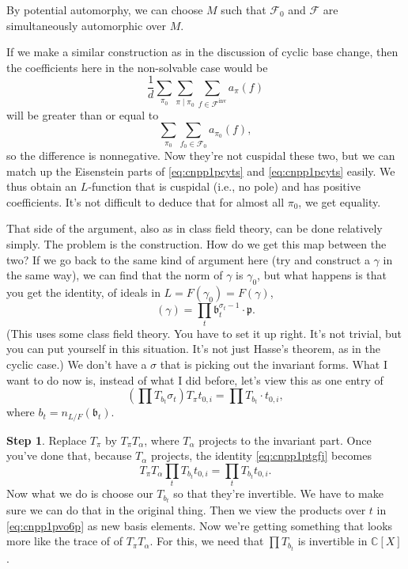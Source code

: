\documentclass[reqno]{amsart} 
\begin{document}
By potential automorphy, we can choose $M$ such that $\mathcal{F}_0$ and $\mathcal{F}$ are simultaneously automorphic over $M$.

If we make a similar construction as in the discussion of cyclic base change, then the coefficients here in the non-solvable case would be
\begin{equation*}
  \frac{1}{d} \sum_{\pi_0} \sum_{\pi \mid \pi_0} \sum_{f \in \mathcal{F}^{\mathrm{inv}}}
  a_{\pi}(f)  
\end{equation*}
will be greater than or equal to
\begin{equation*}
  \sum_{\pi_0}  \sum_{f_0 \in \mathcal{F}_0 }
  a_{\pi_0}(f),
\end{equation*}
so the difference is nonnegative.  Now they're not cuspidal these two, but we can match up the Eisenstein parts of \eqref{eq:cnpp1pcyts} and \eqref{eq:cnpp1pcyts} easily.  We thus obtain an $L$-function that is cuspidal (i.e., no pole) and has positive coefficients.  It's not difficult to deduce that for almost all $\pi_0$, we get equality.

That side of the argument, also as in class field theory, can be done relatively simply.  The problem is the construction.  How do we get this map between the two?  If we go back to the same kind of argument here (try and construct a $\gamma$ in the same way), we can find that the norm of $\gamma$ is $\gamma_0$, but what happens is that you get the identity, of ideals in $L = F(\gamma_0) = F(\gamma)$,
\begin{equation*}
  (\gamma) = \prod_t \mathfrak{b}_t^{\sigma_t - 1} \cdot \mathfrak{p}.
\end{equation*}
(This uses some class field theory.  You have to set it up right.  It's not trivial, but you can put yourself in this situation.  It's not just Hasse's theorem, as in the cyclic case.)  We don't have a $\sigma$ that is picking out the invariant forms.  What I want to do now is, instead of what I did before, let's view this as one entry of 
\begin{equation}\label{eq:cnpp1ptgfj}
  (\prod T_{b_t} \sigma_t) T_\pi t_{0, i}
  = \prod T_{b_t} \cdot t_{0, i},
\end{equation}
where $b_t = n_{L / F}(\mathfrak{b}_t)$.

\textbf{Step 1}. Replace $T_\pi$ by $T_\pi T_\alpha$, where $T_\alpha$ projects to the invariant part.  Once you've done that, because $T_\alpha$ projects, the identity \eqref{eq:cnpp1ptgfj} becomes
\begin{equation}\label{eq:cnpp1pvo6p}
  T_\pi T_\alpha 
  \prod_t T_{b_t}   t_{0, i}
  = \prod_t T_{b_t}  t_{0, i}.
\end{equation}
Now what we do is choose our $T_{b_t}$ so that they're invertible.  We have to make sure we can do that in the original thing.  Then we view the products over $t$ in \eqref{eq:cnpp1pvo6p} as new basis elements.  Now we're getting something that looks more like the trace of of $T_\pi T_\alpha$.  For this, we need that $\prod T_{b_t}$ is invertible in $\mathbb{C}[X]$.
\end{document}
